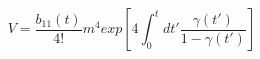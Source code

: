 \begin{equation}
V=\frac{b_{11}(t)}{4!} m^4 exp \left[ 4 \int_0 ^t dt' \frac{\gamma(t')}{1-\gamma(t')} \right]
\end{equation} 

